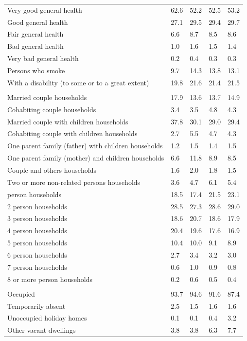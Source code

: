 \documentclass{article}
\begin{document}
\begin{table}[h]
\begin{tabular}{KTTTT}
    \hline
Very good general health & 62.6& 52.2&52.5& 53.2\\
Good general health & 27.1& 29.5& 29.4& 29.7\\
Fair general health & 6.6& 8.7&8.5& 8.6\\
Bad general health & 1.0& 1.6&1.5& 1.4\\
Very bad general health & 0.2& 0.4&0.3& 0.3\\
    \hline
Persons who smoke &  9.7& 14.3&13.8& 13.1\\
    \hline
With a disability (to some or to a great extent) & 19.8& 21.6&21.4& 21.5\\
\hline
    \\ 
    \hline
Married couple households & 17.9& 13.6& 13.7& 14.9\\
Cohabiting couple households & 3.4& 3.5& 4.8& 4.3\\
Married couple with children households & 37.8& 30.1& 29.0& 29.4\\
Cohabiting couple with children households & 2.7& 5.5& 4.7& 4.3\\
One parent family (father) with  children households & 1.2& 1.5& 1.4& 1.5\\
One parent family (mother) and children households &  6.6& 11.8&  8.9&  8.5\\
Couple and others households  & 1.6& 2.0& 1.8& 1.5\\
Two or more non-related persons households & 3.6& 4.7& 6.1& 5.4\\
     person households & 18.5& 17.4& 21.5& 23.1\\
2 person households & 28.5& 27.3& 28.6& 29.0\\
3 person households & 18.6& 20.7& 18.6& 17.9\\
4 person households & 20.4& 19.6& 17.6& 16.9\\
5 person households & 10.4& 10.0&  9.1&  8.9\\
6 person households & 2.7& 3.4& 3.2& 3.0\\
7 person households & 0.6& 1.0& 0.9& 0.8\\
8 or more person households & 0.2& 0.6& 0.5& 0.4\\
\hline
    \\ 
    \hline
Occupied & 93.7& 94.6& 91.6& 87.4\\
Temporarily absent & 2.5& 1.5& 1.6& 1.6\\
Unoccupied holiday homes & 0.1& 0.1& 0.4& 3.2\\
Other vacant dwellings & 3.8& 3.8& 6.3& 7.7\\
\hline
\end{tabular}
\end{table}
\end{document}
